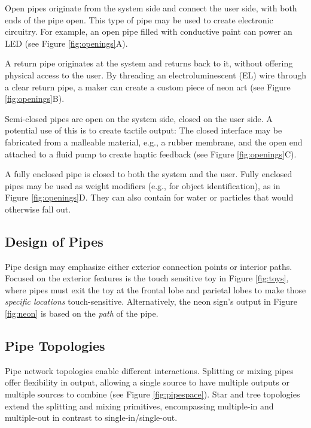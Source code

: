 Open pipes originate from the system side and connect the user side, with both ends of the pipe open. This type of pipe may be used to create electronic circuitry.  For example, an open pipe filled with conductive paint can power an LED (see Figure \ref{fig:openings}A).

A return pipe originates at the system and returns back to it, without offering physical access to the user.  By threading an electroluminescent (EL) wire through a clear return pipe, a maker can create a custom piece of neon art (see Figure \ref{fig:openings}B).

Semi-closed pipes are open on the system side, closed on the user side. A potential use of this is to create tactile output: The closed interface may be fabricated from a malleable material, e.g., a rubber membrane, and the open end attached to a fluid pump to create haptic feedback (see Figure \ref{fig:openings}C).

A fully enclosed pipe is closed to both the system and the user.  Fully enclosed pipes may be used as weight modifiers (e.g., for object identification), as in Figure \ref{fig:openings}D.  They can also contain for water or particles that would otherwise fall out.

\subsection{Design of Pipes}
Pipe design may emphasize either exterior connection points or interior paths.  Focused on the exterior features is the touch sensitive toy in Figure \ref{fig:toys}, where pipes must exit the toy at the frontal lobe and parietal lobes to make those \emph{specific locations} touch-sensitive. Alternatively, the neon sign's output in Figure \ref{fig:neon} is based on the \emph{path} of the pipe. 

\subsection{Pipe Topologies}

Pipe network topologies enable different interactions.  Splitting or mixing pipes offer flexibility in output, allowing a single source to have multiple outputs or multiple sources to combine (see Figure \ref{fig:pipespace}).  Star and tree topologies extend the splitting and mixing primitives, encompassing multiple-in and multiple-out in contrast to single-in/single-out. 

